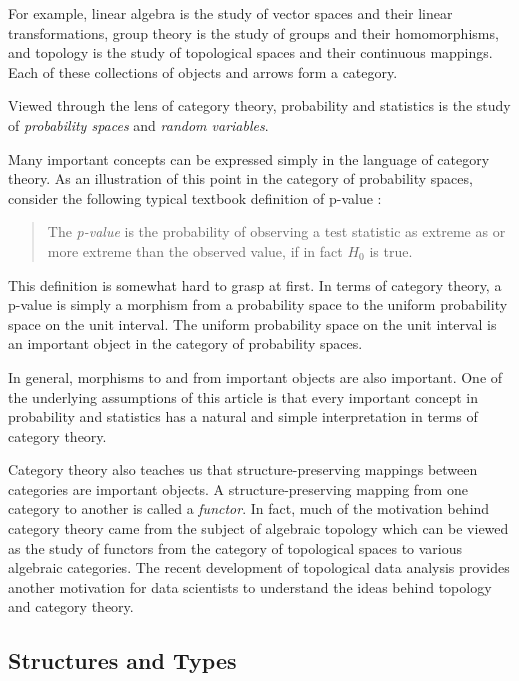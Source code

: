 \documentclass{article}
\begin{document}
For example, linear algebra is the study of vector spaces and their linear transformations,
group theory is the study of groups and their homomorphisms, and
topology is the study of topological spaces and their continuous mappings.
Each of these collections of objects and arrows form a category.

Viewed through the lens of category theory, probability and statistics is the study of {\it probability spaces}
and {\it random variables}.

Many important concepts can be expressed simply in the language of category theory.
As an illustration of this point in the category of probability spaces, consider the following typical textbook definition of p-value
\cite[p351]{mendenhall:ips14}:

\begin{quotation}
The {\it p-value} is the probability of observing a test statistic as extreme as or more extreme than the observed value, if in fact $H_0$ is true.
\end{quotation}

This definition is somewhat hard to grasp at first.
In terms of category theory, a p-value is simply a morphism from a probability space to the uniform probability space on the unit interval.
The uniform probability space on the unit interval is an important object in the category of probability spaces.

In general, morphisms to and from important objects are also important.
One of the underlying assumptions of this article is that every important concept in probability and statistics has a natural and simple interpretation in terms of  category theory.

Category theory also teaches us that structure-preserving mappings between categories are important objects.
A structure-preserving mapping from one category to another is called a {\it functor}.
In fact, much of the motivation behind category theory came from the subject of algebraic topology which can be viewed as the study of functors from the category of topological spaces to various algebraic categories.
The recent development of topological data analysis provides another motivation for data scientists to understand the ideas behind topology and category theory.

\subsection{Structures and Types}
\end{document}
